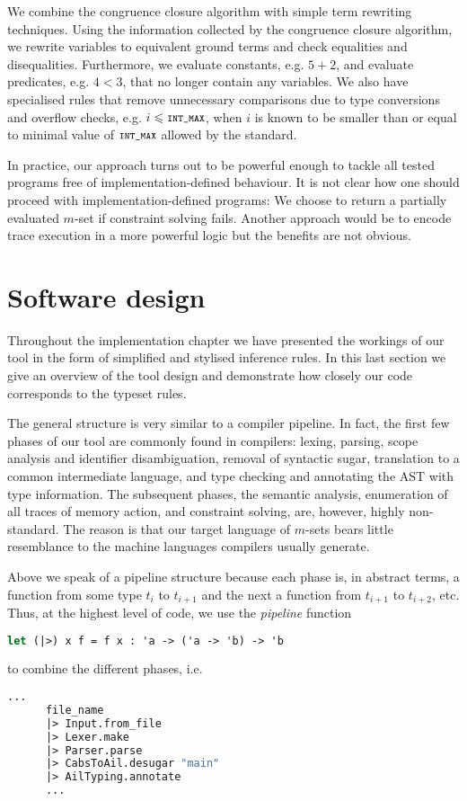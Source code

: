 \documentclass[a4paper,12pt]{scrbook}
\theoremstyle{plain}
\theoremstyle{definition}
\renewcommand{\leq}{\leqslant}
\newcommand{\cc}[1]{{\text{\footnotesize\ttfamily{#1}}}}
\begin{document}
We combine the congruence closure algorithm with simple term rewriting
techniques. Using the information collected by the congruence closure algorithm,
we rewrite variables to equivalent ground terms and check equalities and
disequalities. Furthermore, we evaluate constants, e.g. $5 + 2$, and evaluate
predicates, e.g. $4 < 3$, that no longer contain any variables. We also have
specialised rules that remove unnecessary comparisons due to type conversions
and overflow checks, e.g. $i \leq \cc{INT\_MAX}$, when $i$ is known to be
smaller than or equal to minimal value of $\cc{INT\_MAX}$ allowed by the
standard.

In practice, our approach turns out to be powerful enough to tackle all tested
programs free of implementation-defined behaviour. It is not clear how one
should proceed with implementation-defined programs: We choose to return a
partially evaluated $m$-set if constraint solving fails. Another approach would
be to encode trace execution in a more powerful logic but the benefits are not
obvious.

\section{Software design}
Throughout the implementation chapter we have presented the workings of our tool
in the form of simplified and stylised inference rules. In this last section we
give an overview of the tool design and demonstrate how closely our code
corresponds to the typeset rules.

The general structure is very similar to a compiler pipeline. In fact, the first
few phases of our tool are commonly found in compilers: lexing, parsing, scope
analysis and identifier disambiguation, removal of syntactic sugar, translation
to a common intermediate language, and type checking and annotating the AST with
type information. The subsequent phases, the semantic analysis, enumeration of
all traces of memory action, and constraint solving, are, however, highly
non-standard. The reason is that our target language of $m$-sets bears little
resemblance to the machine languages compilers usually generate.

Above we speak of a pipeline structure because each phase is, in abstract terms,
a function from some type $t_i$ to $t_{i+1}$ and the next a function from
$t_{i+1}$ to $t_{i+2}$, etc. Thus, at the highest level of code, we use the
\textit{pipeline} function \cite[p. 45]{expertFS}
\begin{lstlisting}[language=ML, frame=none]
    let (|>) x f = f x : 'a -> ('a -> 'b) -> 'b
\end{lstlisting}
to combine the different phases, i.e.
\begin{lstlisting}[language=ML]
...
      file_name
      |> Input.from_file
      |> Lexer.make
      |> Parser.parse
      |> CabsToAil.desugar "main"
      |> AilTyping.annotate
      ...
\end{lstlisting}
\end{document}
